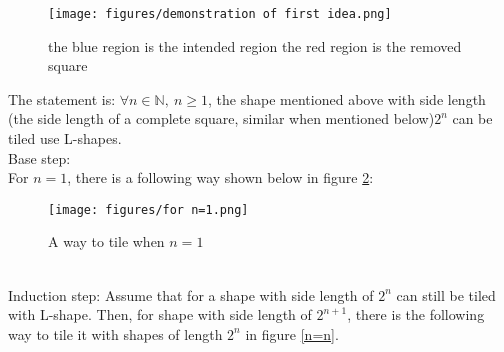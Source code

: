 \documentclass{article}
\begin{document}
        \begin{figure}[h]
            \centering
            \texttt{[image: figures/demonstration of first idea.png]}
            \caption{the blue region is the intended region the red region is the removed square}
            \label{first}
        \end{figure}
        The statement is: \(\forall n\in \mathbb{N},\ n\geqslant 1\), the shape mentioned above with side length (the side length of a complete square, similar when mentioned below)\(2^n\)
        can be tiled use L-shapes.\\
        Base step:\\
        For \(n=1\), there is a following way shown below in figure \ref{n=1}:\\
        \begin{figure}[h]
            \centering
            \texttt{[image: figures/for n=1.png]}
            \caption{A way to tile when \(n=1\)}
            \label{n=1}
        \end{figure}\\
        
        Induction step:
        Assume that for a shape with side length of \(2^n\) can still be tiled with L-shape. Then, for shape with side length of \(2^{n+1}\), there is the following way to tile it with 
        shapes of length \(2^n\) in figure \ref{n=n}.\\ 
        
\end{document}
